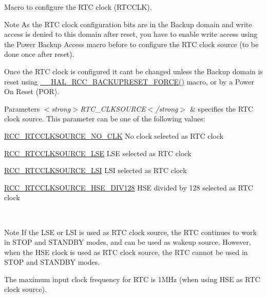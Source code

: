 Macro to configure the R\+TC clock (R\+T\+C\+C\+LK). 

\begin{DoxyNote}{Note}
As the R\+TC clock configuration bits are in the Backup domain and write access is denied to this domain after reset, you have to enable write access using the Power Backup Access macro before to configure the R\+TC clock source (to be done once after reset). 

Once the R\+TC clock is configured it can\textquotesingle{}t be changed unless the Backup domain is reset using \hyperlink{group___r_c_c___r_t_c___clock___configuration_ga3bf7da608ff985873ca8e248fb1dc4f0}{\+\_\+\+\_\+\+H\+A\+L\+\_\+\+R\+C\+C\+\_\+\+B\+A\+C\+K\+U\+P\+R\+E\+S\+E\+T\+\_\+\+F\+O\+R\+C\+E()} macro, or by a Power On Reset (P\+OR).
\end{DoxyNote}

\begin{DoxyParams}{Parameters}
{\em $<$strong$>$\+R\+T\+C\+\_\+\+C\+L\+K\+S\+O\+U\+R\+C\+E$<$/strong$>$} & specifies the R\+TC clock source. This parameter can be one of the following values\+: \begin{DoxyItemize}
\item \hyperlink{group___r_c_c___r_t_c___clock___source_gacce0b2f54d103340d8c3a218e86e295d}{R\+C\+C\+\_\+\+R\+T\+C\+C\+L\+K\+S\+O\+U\+R\+C\+E\+\_\+\+N\+O\+\_\+\+C\+LK} No clock selected as R\+TC clock \item \hyperlink{group___r_c_c___r_t_c___clock___source_ga5dca8d63f250a20bd6bc005670d0c150}{R\+C\+C\+\_\+\+R\+T\+C\+C\+L\+K\+S\+O\+U\+R\+C\+E\+\_\+\+L\+SE} L\+SE selected as R\+TC clock \item \hyperlink{group___r_c_c___r_t_c___clock___source_gab47a1afb8b5eef9f20f4772961d0a5f4}{R\+C\+C\+\_\+\+R\+T\+C\+C\+L\+K\+S\+O\+U\+R\+C\+E\+\_\+\+L\+SI} L\+SI selected as R\+TC clock \item \hyperlink{group___r_c_c___r_t_c___clock___source_ga7e022374ec3ceffa94e5bb6310c35c83}{R\+C\+C\+\_\+\+R\+T\+C\+C\+L\+K\+S\+O\+U\+R\+C\+E\+\_\+\+H\+S\+E\+\_\+\+D\+I\+V128} H\+SE divided by 128 selected as R\+TC clock \end{DoxyItemize}
\\
\hline
\end{DoxyParams}
\begin{DoxyNote}{Note}
If the L\+SE or L\+SI is used as R\+TC clock source, the R\+TC continues to work in S\+T\+OP and S\+T\+A\+N\+D\+BY modes, and can be used as wakeup source. However, when the H\+SE clock is used as R\+TC clock source, the R\+TC cannot be used in S\+T\+OP and S\+T\+A\+N\+D\+BY modes. 

The maximum input clock frequency for R\+TC is 1\+M\+Hz (when using H\+SE as R\+TC clock source). 
\end{DoxyNote}


